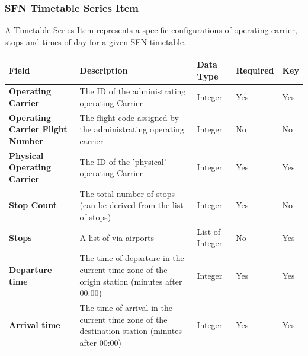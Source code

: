 \subsubsection*{SFN Timetable Series Item}

A Timetable Series Item represents a specific configurations of operating carrier, stops and times of day for a given SFN timetable.

\begin{table}[H]
\centering
\begin{tabular}{|>{\raggedright\arraybackslash}p{2.5cm}|>{\raggedright\arraybackslash}p{4cm}|>{\raggedright\arraybackslash}p{2.5cm}|>{\raggedright\arraybackslash}p{2cm}|>{\raggedright\arraybackslash}p{1.2cm}|}
\hline
\textbf{Field}                           & \textbf{Description}                                                                           & \textbf{Data Type}            & \textbf{Required} & \textbf{Key} \\ \hline
\textbf{Operating Carrier}               & The ID of the administrating operating Carrier                                                 & Integer                       & Yes               & Yes          \\ \hline
\textbf{Operating Carrier Flight Number} & The flight code assigned by the administrating operating carrier                               & Integer                       & No                & No           \\ \hline
\textbf{Physical Operating Carrier}      & The ID of the 'physical' operating Carrier                                                     & Integer                       & Yes               & Yes          \\ \hline
\textbf{Stop Count}                      & The total number of stops (can be derived from the list of stops)                              & Integer                       & Yes               & No           \\ \hline
\textbf{Stops}                           & A list of via airports                                                                         & List of Integer               & No                & Yes          \\ \hline
\textbf{Departure time}                  & The time of departure in the current time zone of the origin station (minutes after 00:00)     & Integer                       & Yes               & Yes          \\ \hline
\textbf{Arrival time}                    & The time of arrival in the current time zone of the destination station (minutes after 00:00)  & Integer                       & Yes               & Yes          \\ \hline

\end{tabular}
\end{table}
